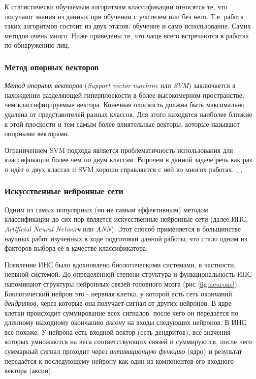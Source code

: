 \documentclass[12pt]{report}
\begin{document}
К статистически обучаемым алгоритмам классификации относятся те, что получают знания из данных при обучении с 
учителем или без него. Т.е. работа таких алгоритмов состоит из двух этапов: обучение и само использование. Самих 
методов очень много. Ниже приведены те, что чаще всего встречаются в работах по обнаружению лиц. 

\subsubsection{Метод опорных векторов}
\emph{Метод опорных векторов} (\textit{Support vector machine} или \textit{SVM}) заключается в нахождении 
разделяющей 
гиперплоскости в более высокомерном пространстве, чем классифицируемые вектора. Конечная плоскость должна быть 
максимально удалена от представителей разных классов. Для этого находятся наиболее близкие к этой плоскости и тем 
самым более влиятельные векторы, которые называют опорными векторами. \citep{shavers2006svm}

Ограничением SVM подхода является проблематичность использования для классификации более чем по двум классам. 
Впрочем в 
данной задаче речь как раз и идёт о двух классах и SVM хорошо справляется с ней во многих работах. \citep
{shavers2006svm}, \citep{jee2004eye}, \citep{saxena2008real}
\subsubsection{Искусственные нейронные сети}
Одним из самых популярных (но не самым эффективным) методом классификации до сих пор является искусственные 
нейронные 
сети (далее ИНС, \textit{Artificial Neural Network} или \textit{ANN}). Этот способ применяется в большинстве 
научных 
работ изученных в ходе подготовки данной работы, что стало одним из факторов выбора её в качестве классификатора. 

Появление ИНС было вдохновлено биологическими системами, в частности, нервной системой. До определённой степени 
структура и функциональность ИНС напоминают структуры нейронных связей головного мозга (рис \ref{fig:neurons}). 
Биологический нейрон это - нервная клетка, у которой есть сеть окончаний \emph{дендритов}, через которые она 
получает сигнал от 
других нейронов. В ядре клетки происходит суммирование всех сигналов, после чего он передаётся по длинному 
выходному 
окончанию \emph{аксону} на входы следующих нейронов. В ИНС всё похоже. У нейрона есть входной вектор (сеть 
дендритов), все значения которых умножаются на веса соответствующих связей и суммируются, после чего суммарный 
сигнал 
проходит через \emph{активационную функцию} (ядро) и результат передаётся к последующему нейрону как один из 
компонентов его входного вектора (аксон). 
\end{document}
